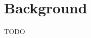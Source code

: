 \documentclass[../../submission.tex]{subfiles}
\begin{document}
\section{Background}
TODO
\end{document}
